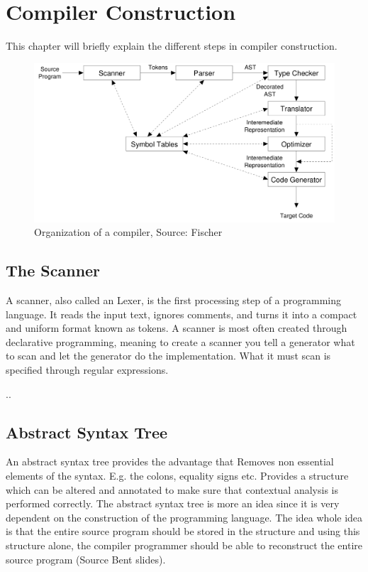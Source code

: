 \chapter{Compiler Construction}
This chapter will briefly explain the different steps in compiler construction. 
 \begin{figure}[H]
\centering
\includegraphics[width=\textwidth]{figures/compiler-process.png}
\caption{Organization of a compiler, Source: Fischer \cite{crafting-a-compiler} }
\label{syntax-overview}
\end{figure}

\section{The Scanner}
A scanner, also called an Lexer, is the first processing step of a programming language. It reads the input text, ignores comments, and turns it into a compact and uniform format known as tokens. 
A scanner is most often created through declarative programming, meaning to create a scanner you tell a generator what to scan and let the generator do the implementation. What it must scan is specified through regular expressions.

..

\section{Abstract Syntax Tree}
An abstract syntax tree provides the advantage that 
Removes non essential elements of the syntax. E.g. the colons, equality signs etc. 
Provides a structure which can be altered and annotated to make sure that contextual analysis is performed correctly.
The abstract syntax tree is more an idea since it is very dependent on the construction of the programming language. The idea whole idea is that the entire source program should be stored in the structure and using this structure alone, the compiler programmer should be able to reconstruct the entire source program (Source Bent slides).

